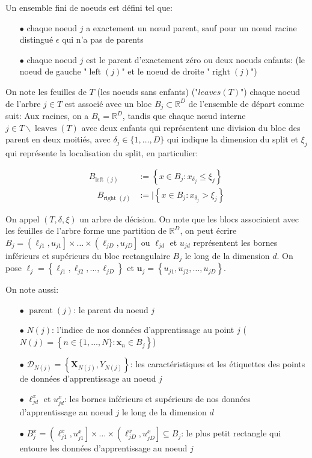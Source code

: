 Un ensemble fini de noeuds est défini tel que:

\begin{itemize}
    \item[$\bullet$] chaque noeud $j$ a exactement un nœud parent, sauf pour un nœud racine distingué $\epsilon$ qui n'a pas de parents 
    \item[$\bullet$] chaque noeud $j$ est le parent d'exactement zéro ou deux noeuds enfants: (le noeud de gauche "$\operatorname{left}(j)$" et le noeud de droite "$\operatorname{right}(j)$")
\end{itemize}

On note les feuilles de $T$ (les noeuds sans enfants) ("$leaves(T)$") chaque noeud de l'arbre $j\in T$ est associé avec un bloc $B_j\subset\mathbb{R}^D$ de l'ensemble de départ comme suit: 
Aux racines, on a $B_\epsilon=\mathbb{R}^D$, tandis que chaque nœud interne $j\in T \backslash \operatorname{leaves}(T)$ avec deux enfants qui représentent une division du bloc des parent en deux moitiés, avec $\delta_j\in\{1,\dots,D\}$ qui indique la dimension du split et $\xi_{j}$ qui représente la localisation du split, en particulier:

$$
\begin{aligned}
B_{\text {left }(j)}&:=\left\{x \in B_{j}: x_{\delta_{j}} \leq \xi_{j}\right\} \\
\quad B_{\text {right }(j)}&:=\mid\left\{x \in B_{j}: x_{\delta_{j}}>\xi_{j}\right\}
\end{aligned}
$$

On appel $(T,\delta,\xi)$ un arbre de décision. On note que les blocs associaient avec les feuilles de l'arbre forme une partition de $\mathbb{R}^D$, on peut écrire $B_{j}=\left(\ell_{j 1}, u_{j 1}\right] \times \ldots \times\left(\ell_{j D}, u_{j D}\right]$ ou $\ell_{jd}$ et $u_{jd}$ représentent les bornes inférieurs et supérieurs du bloc rectangulaire $B_j$ le long de la dimension $d$. On pose $\ell_{j}=\left\{\ell_{j 1}, \ell_{j 2}, \ldots, \ell_{j D}\right\}$ et $\mathbf{u}_{j}=\left\{u_{j 1}, u_{j 2}, \ldots, u_{j D}\right\}$.

On note aussi:
\begin{itemize}
    \item[$\bullet$] $\operatorname{parent}(j)$: le parent du noeud $j$
    \item[$\bullet$] $N(j)$: l'indice de nos données d'apprentissage au point $j$ ($N(j)=\left\{n \in\{1, \ldots, N\}: \boldsymbol{x}_{n} \in B_{j}\right\}$) 
    \item[$\bullet$] $\mathcal{D}_{N(j)}=\left\{\boldsymbol{X}_{N(j)}, Y_{N(j)}\right\}$: les caractéristiques et les étiquettes des points de données d'apprentissage au noeud $j$
    \item[$\bullet$] $\ell_{j d}^{x}$ et $u_{j d}^{x}$: les bornes inférieurs et supérieurs de nos données d'apprentissage au noeud $j$ le long de la dimension $d$
    \item[$\bullet$] $B_{j}^{x}=\left(\ell_{j 1}^{x}, u_{j 1}^{x}\right] \times \ldots \times\left(\ell_{j D}^{x}, u_{j D}^{x}\right] \subseteq B_{j}$: le plus petit rectangle qui entoure les données d'apprentissage au noeud $j$
\end{itemize}

